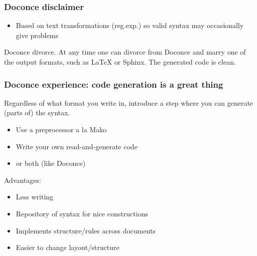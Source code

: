 \documentclass{beamer}
\newenvironment{graybox1admon}[1][]{\begin{block}{#1}}{\end{block}}
\begin{document}
\begin{frame}
\frametitle{Doconce disclaimer}

\begin{itemize}
 \item Based on text transformations (reg.exp.) so valid syntax may
   occasionally give problems
\end{itemize}

\noindent

\begin{graybox1admon}[Doconce divorce.]
At any time one can divorce from Doconce and marry one of the output
formats, such as {\LaTeX} or Sphinx. The generated code is clean.
\end{graybox1admon}
\end{frame}

\begin{frame}
\frametitle{Doconce experience: code generation is a great thing}

\begin{graybox1admon}[]

Regardless of what format you write in, introduce a step where
you can generate (parts of) the syntax.

\begin{itemize}
 \item Use a preprocessor a la Mako

 \item Write your own read-and-generate code

 \item or both (like Doconce)
\end{itemize}

\noindent
Advantages:

\begin{itemize}
 \item Less writing

 \item Repository of syntax for nice constructions

 \item Implements structure/rules across documents

 \item Easier to change layout/structure
\end{itemize}

\noindent
\end{graybox1admon}
\end{frame}
\end{document}
